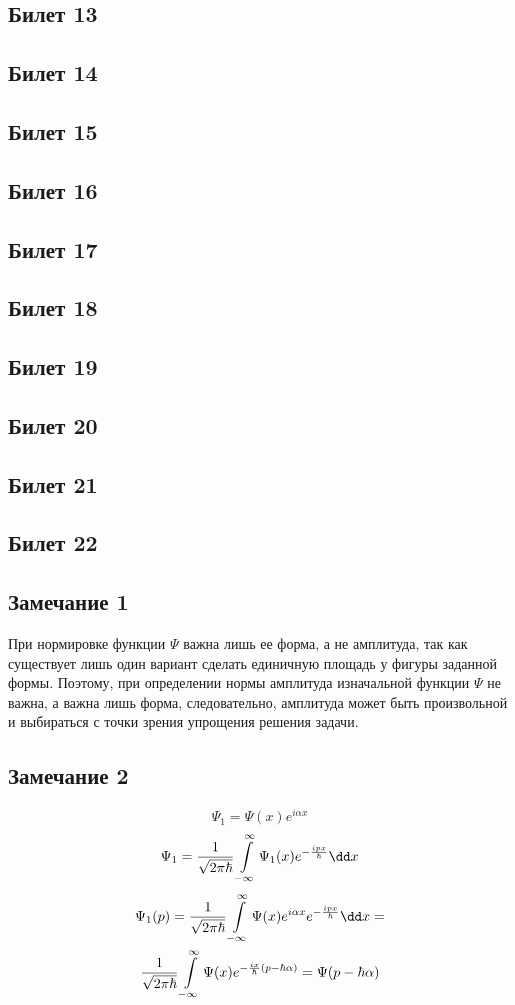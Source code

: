 \subsection{Билет 13}

\subsection{Билет 14}

\subsection{Билет 15}

\subsection{Билет 16}

\subsection{Билет 17}

\subsection{Билет 18}

\subsection{Билет 19}

\subsection{Билет 20}

\subsection{Билет 21}

\subsection{Билет 22}

\subsection{Замечание 1}
При нормировке функции $\Psi$ важна лишь ее форма, а не амплитуда, так как
существует лишь один вариант сделать единичную площадь у фигуры
заданной формы. Поэтому, при определении нормы амплитуда изначальной
функции $\Psi$ не важна, а важна лишь форма, следовательно, амплитуда
может быть произвольной и выбираться с точки зрения упрощения решения
задачи.
\subsection{Замечание 2}
$$\Psi_1=\Psi(x)e^{i \alpha x} $$
$$\Psi_1 = \frac{1}{\sqrt{2\pi\hbar}}\infint \Psi_1(x) e^{-\frac{ipx}{\hbar}} \dd x$$
\begin{gather}
\Psi_1(p)=\frac{1}{\sqrt{2\pi\hbar}}\infint \Psi(x) e^{i \alpha x} e^{-\frac{ipx}{\hbar}} \dd x =\\
\frac{1}{\sqrt{2\pi\hbar}}\infint \Psi(x) e^{-\frac{ix}{\hbar}(p-\hbar \alpha)}=\Psi(p-\hbar \alpha)
\end{gather}

